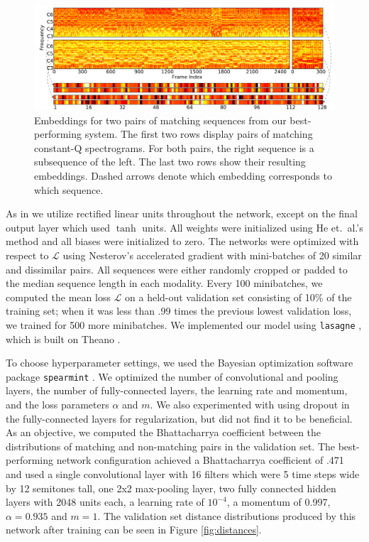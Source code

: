 \documentclass{article}
\begin{document}
\begin{figure}[htb!]
  \centering
  \includegraphics[width=\textwidth]{embeddings.pdf}
  \caption{Embeddings for two pairs of matching sequences from our best-performing system.  The first two rows display pairs of matching constant-Q spectrograms.  For both pairs, the right sequence is a subsequence of the left.  The last two rows show their resulting embeddings.  Dashed arrows denote which embedding corresponds to which sequence.}
  \label{fig:embeddings}
\end{figure}

As in \cite{raffel2015large} we utilize rectified linear units throughout the network, except on the final output layer which used $\tanh$ units.
All weights were initialized using He et.\ al.'s method \cite{he2015delving} and all biases were initialized to zero.
The networks were optimized with respect to $\mathcal{L}$ using Nesterov's accelerated gradient \cite{sutskever2013importance} with mini-batches of 20 similar and dissimilar pairs.
All sequences were either randomly cropped or padded to the median sequence length in each modality.
Every 100 minibatches, we computed the mean loss $\mathcal{L}$ on a held-out validation set consisting of 10\% of the training set; when it was less than .99 times the previous lowest validation loss, we trained for 500 more minibatches.
We implemented our model using \texttt{lasagne} \cite{dieleman2015lasagne}, which is built on Theano \cite{bergstra2010theano, bastien2012theano}.

To choose hyperparameter settings, we used the Bayesian optimization software package \texttt{spearmint} \cite{snoek2012practical}.
We optimized the number of convolutional and pooling layers, the number of fully-connected layers, the learning rate and momentum, and the loss parameters $\alpha$ and $m$.
We also experimented with using dropout \cite{hinton2012improving} in the fully-connected layers for regularization, but did not find it to be beneficial.
As an objective, we computed the Bhattacharrya coefficient \cite{bhattacharyya1943measure} between the distributions of matching and non-matching pairs in the validation set.
The best-performing network configuration achieved a Bhattacharrya coefficient of .471 and used a single convolutional layer with 16 filters which were 5 time steps wide by 12 semitones tall, one 2x2 max-pooling layer, two fully connected hidden layers with 2048 units each, a learning rate of $10^{-4}$, a momentum of 0.997, $\alpha = 0.935$ and $m = 1$.
The validation set distance distributions produced by this network after training can be seen in Figure \ref{fig:distances}.
\end{document}
